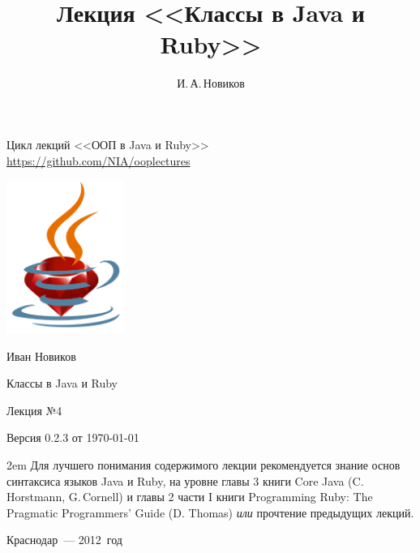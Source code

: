\documentclass[a4paper, 14pt, titlepage]{extarticle}
\author{И.\,А.\,Новиков}
\title{Лекция <<Классы в Java и Ruby>>}
\newcommand{\eng}[1]{{\English #1}}
\newenvironment{indented}%
    { \begingroup %
        \noindent %
        \leftskip2em %
        \rightskip\leftskip }%
    { \par\endgroup }
\begin{document}

  \begin{titlepage}
  \begin{center}
    Цикл лекций <<ООП в Java и Ruby>>\\
    \url{https://github.com/NIA/ooplectures}

    \vspace{4cm}

    \includegraphics[height=5cm]{ruby-in-cup}

    Иван Новиков

    {\Large Классы в Java и Ruby}

    Лекция №4

    {\small Версия 0.2.3 от \today}

  \end{center}

    \begin{flushright}

    \end{flushright}

    \vspace{3cm}

    \begin{indented}
      \small Для лучшего понимания содержимого лекции рекомендуется знание основ синтаксиса языков
      Java и Ruby, на уровне главы 3 книги \eng{Core Java (C.\,Horstmann, G.\,Cornell)} и главы 2
      части I книги \eng{Programming Ruby: The Pragmatic Programmers' Guide (D. Thomas)} \emph{или}
      прочтение предыдущих лекций.
    \end{indented}

    \vfill

  \begin{center}

    Краснодар~--- 2012~год

  \end{center}
  \end{titlepage}
\end{document}
